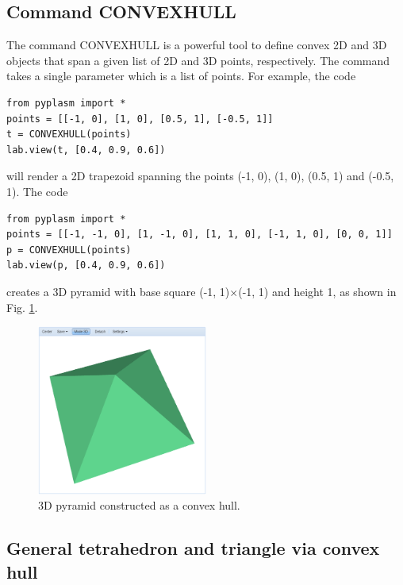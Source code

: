 \documentclass{article}
\begin{document}
\subsection{Command CONVEXHULL}\label{par:chull}

The command CONVEXHULL is a powerful tool to define convex 2D and 3D objects
that span a given list of 2D and 3D points, respectively. The command takes 
a single parameter which is a list of points. For example, the code

\begin{verbatim}
from pyplasm import *
points = [[-1, 0], [1, 0], [0.5, 1], [-0.5, 1]]
t = CONVEXHULL(points)
lab.view(t, [0.4, 0.9, 0.6])
\end{verbatim}
will render a 2D trapezoid spanning the points (-1, 0), (1, 0), (0.5, 1) and 
(-0.5, 1). The code

\begin{verbatim}
from pyplasm import *
points = [[-1, -1, 0], [1, -1, 0], [1, 1, 0], [-1, 1, 0], [0, 0, 1]]
p = CONVEXHULL(points)
lab.view(p, [0.4, 0.9, 0.6])
\end{verbatim}
creates a 3D pyramid with base square (-1, 1)$\times$(-1, 1) and height 1,
as shown in Fig. \ref{fig:pyra}.
\newpage

\begin{figure}[!ht]
\begin{center}
\includegraphics[width=0.5\textwidth]{img/pyra.png}
\end{center}
\vspace{-2mm}
\caption{3D pyramid constructed as a convex hull.}
\label{fig:pyra}
\end{figure}
\noindent


\subsection{General tetrahedron and triangle via convex hull}
\end{document}
